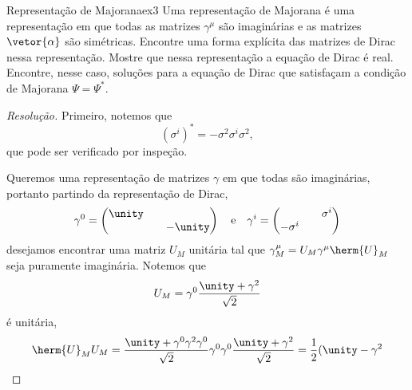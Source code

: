 \begin{exercício}{Representação de Majorana}{ex3}
    Uma representação de Majorana é uma representação em que todas as matrizes \(\gamma^\mu\) são imaginárias e as matrizes \(\vetor{\alpha}\) são simétricas. Encontre uma forma explícita das matrizes de Dirac nessa representação. Mostre que nessa representação a equação de Dirac é real. Encontre, nesse caso, soluções para a equação de Dirac que satisfaçam a condição de Majorana \(\Psi = \Psi^*\).
\end{exercício}
\begin{proof}[Resolução]
    Primeiro, notemos que
    \begin{equation*}
        (\sigma^i)^* = -\sigma^2 \sigma^i \sigma^2,
    \end{equation*}
    que pode ser verificado por inspeção. 

    Queremos uma representação de matrizes \(\gamma\) em que todas são imaginárias, portanto partindo da representação de Dirac,
    \begin{equation*}
        \gamma^0 = \begin{pmatrix}
            \unity &&\\
                   && -\unity
        \end{pmatrix}
        \quad\text{e}\quad
        \gamma^i = \begin{pmatrix}
            && \sigma^i\\
            -\sigma^i &&
        \end{pmatrix}
    \end{equation*}
    desejamos encontrar uma matriz \(U_M\) unitária tal que \(\gamma_M^\mu = U_M \gamma^\mu \herm{U}_M\) seja puramente imaginária. Notemos que
    \begin{equation*}
        U_M = \gamma^0\frac{\unity + \gamma^2}{\sqrt{2}}
    \end{equation*}
    é unitária,
    \begin{equation*}
        \herm{U}_M U_M = \frac{\unity + \gamma^0 \gamma^2 \gamma^0}{\sqrt{2}} \gamma^0 \gamma^0 \frac{\unity + \gamma^2}{\sqrt{2}} = \frac12 (\unity - \gamma^2
    \end{equation*}

\end{proof}
